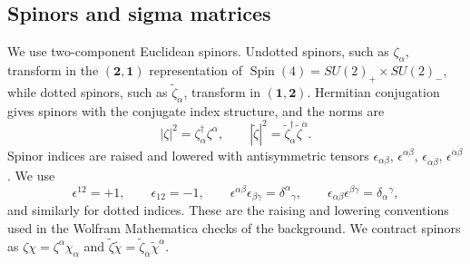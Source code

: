\documentclass[11pt,a4paper]{article}
\numberwithin{equation}{section}
\theoremstyle{plain}
\theoremstyle{definition}
\theoremstyle{remark}
\begin{document}
\subsection{Spinors and sigma matrices}

We use two-component Euclidean spinors.  Undotted spinors, such as \(\zeta_\alpha\), transform in the \((\mathbf 2,\mathbf 1)\) representation of \(\operatorname{Spin}(4)=SU(2)_+\times SU(2)_-\), while dotted spinors, such as \(\widetilde\zeta_{\dot\alpha}\), transform in \((\mathbf 1,\mathbf 2)\).  Hermitian conjugation gives spinors with the conjugate index structure, and the norms are
\begin{equation}
|\zeta|^2=\zeta^\dagger_{\alpha}\zeta^\alpha,
\qquad
|\widetilde\zeta|^2=\widetilde\zeta^\dagger_{\dot\alpha}\widetilde\zeta^{\dot\alpha}.
\label{eq:app-spinor-norms}
\end{equation}
Spinor indices are raised and lowered with antisymmetric tensors \(\epsilon_{\alpha\beta}\), \(\epsilon^{\alpha\beta}\), \(\epsilon_{\dot\alpha\dot\beta}\), \(\epsilon^{\dot\alpha\dot\beta}\).  We use
\begin{equation}
\epsilon^{12}=+1,\qquad \epsilon_{12}=-1,
\qquad
\epsilon^{\alpha\beta}\epsilon_{\beta\gamma}=\delta^\alpha{}_{\gamma},
\qquad
\epsilon_{\alpha\beta}\epsilon^{\beta\gamma}=\delta_\alpha{}^{\gamma},
\label{eq:app-epsilon-conventions}
\end{equation}
and similarly for dotted indices.  These are the raising and lowering conventions used in the Wolfram Mathematica checks of the background.  We contract spinors as \(\zeta\chi=\zeta^\alpha\chi_\alpha\) and \(\widetilde\zeta\widetilde\chi=\widetilde\zeta_{\dot\alpha}\widetilde\chi^{\dot\alpha}\).
\end{document}
